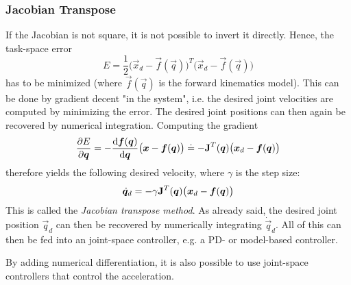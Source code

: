 			\subsubsection{Jacobian Transpose}
				If the Jacobian is not square, it is not possible to invert it directly. Hence, the task-space error
				\begin{equation*}
					E = \frac{1}{2} \big(\vec{x}_d - \vec{f}(\vec{q})\big)^T \big(\vec{x}_d - \vec{f}(\vec{q})\big)
				\end{equation*}
				has to be minimized (where \(\vec{f}(\vec{q})\) is the forward kinematics model). This can be done by gradient decent "in the system", i.e. the desired joint velocities are computed by minimizing the error. The desired joint positions can then again be recovered by numerical integration. Computing the gradient
				\begin{equation*}
					\pdv{E}{\bm{q}} = -\dv{\bm{f}(\bm{q})}{\bm{q}} \big(\bm{x} - \bm{f}(\bm{q})\big) \doteq -\bm{\mathrm{J}}^T(\bm{q}) \big(\bm{x}_d - \bm{f}(\bm{q})\big)
				\end{equation*}
				therefore yields the following desired velocity, where \(\gamma\) is the step size:
				\begin{equation*}
					\dot{\bm{q}}_d = -\gamma \bm{\mathrm{J}}^T(\bm{q}) \big(\bm{x}_d - \bm{f}(\bm{q})\big)
				\end{equation*}
				This is called the \emph{Jacobian transpose method}. As already said, the desired joint position \( \vec{q}_d \) can then be recovered by numerically integrating \( \dot{\vec{q}}_d \). All of this can then be fed into an joint-space controller, e.g. a PD- or model-based controller.

				By adding numerical differentiation, it is also possible to use joint-space controllers that control the acceleration.

